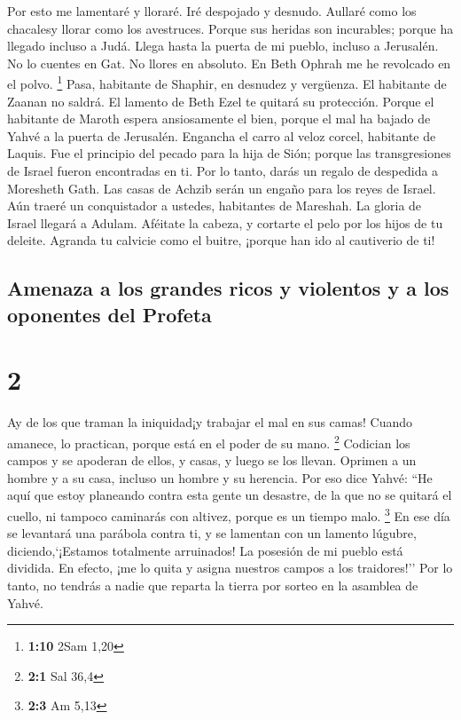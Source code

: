  Por esto me lamentaré y lloraré. Iré despojado y desnudo.
Aullaré como los chacalesy llorar como los avestruces. 
Porque sus heridas son incurables; porque ha llegado incluso a Judá.
Llega hasta la puerta de mi pueblo, incluso a Jerusalén. 
No lo cuentes en Gat. No llores en absoluto. En Beth Ophrah me he
revolcado en el polvo. \footnote{\textbf{1:10} 2Sam 1,20}
 Pasa, habitante de Shaphir, en desnudez y vergüenza. El
habitante de Zaanan no saldrá. El lamento de Beth Ezel te quitará su
protección.  Porque el habitante de Maroth espera
ansiosamente el bien, porque el mal ha bajado de Yahvé a la puerta de
Jerusalén.  Engancha el carro al veloz corcel, habitante
de Laquis. Fue el principio del pecado para la hija de Sión; porque las
transgresiones de Israel fueron encontradas en ti.  Por
lo tanto, darás un regalo de despedida a Moresheth Gath. Las casas de
Achzib serán un engaño para los reyes de Israel.  Aún
traeré un conquistador a ustedes, habitantes de Mareshah. La gloria de
Israel llegará a Adulam.  Aféitate la cabeza, y cortarte
el pelo por los hijos de tu deleite. Agranda tu calvicie como el buitre,
¡porque han ido al cautiverio de ti!

\hypertarget{amenaza-a-los-grandes-ricos-y-violentos-y-a-los-oponentes-del-profeta}{%
\subsection{Amenaza a los grandes ricos y violentos y a los oponentes
del
Profeta}\label{amenaza-a-los-grandes-ricos-y-violentos-y-a-los-oponentes-del-profeta}}

\hypertarget{section-1}{%
\section{2}\label{section-1}}

 Ay de los que traman la iniquidad¡y trabajar el mal en
sus camas! Cuando amanece, lo practican, porque está en el poder de su
mano. \footnote{\textbf{2:1} Sal 36,4}  Codician los
campos y se apoderan de ellos, y casas, y luego se los llevan. Oprimen a
un hombre y a su casa, incluso un hombre y su herencia. 
Por eso dice Yahvé: ``He aquí que estoy planeando contra esta gente un
desastre, de la que no se quitará el cuello, ni tampoco caminarás con
altivez, porque es un tiempo malo. \footnote{\textbf{2:3} Am 5,13}
 En ese día se levantará una parábola contra ti, y se
lamentan con un lamento lúgubre, diciendo,`¡Estamos totalmente
arruinados! La posesión de mi pueblo está dividida. En efecto, ¡me lo
quita y asigna nuestros campos a los traidores!''  Por lo
tanto, no tendrás a nadie que reparta la tierra por sorteo en la
asamblea de Yahvé.


